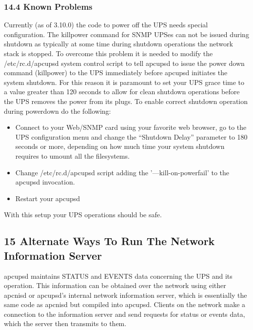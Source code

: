 {{{{{{{{{{\label{Known-Problems}

\subsubsection*{14.4 Known Problems}

Currently (as of 3.10.0) the code to power off the UPS needs special
configuration. The killpower command for SNMP UPSes can not be issued during
shutdown as typically at some time during shutdown operations the network
stack is stopped. To overcome this problem it is needed to modify the
/etc/rc.d/apcupsd system control script to tell apcupsd to issue the power
down command (killpower) to the UPS immediately before apcupsd initiates the
system shutdown. For this reason it is paramount to set your UPS grace time to
a value greater than 120 seconds to allow for clean shutdown operations before
the UPS removes the power from its plugs. To enable correct shutdown operation
during powerdown do the following:  

\begin{itemize}
\item Connect to your Web/SNMP card using your favorite web browser, go to the
UPS configuration menu and change the ``Shutdown Delay'' parameter to 180
seconds or more, depending on how much time your system shutdown requires to
umount all the filesystems.  
\item Change /etc/rc.d/apcupsd script adding the '{---}kill-on-powerfail' to
the apcupsd invocation.  
\item Restart your apcupsd 
\end{itemize}

With this setup your UPS operations should be safe. 

\label{Alternate-Ways-To-Run-The-Network-Information-Server}

\subsection*{15 Alternate Ways To Run The Network Information Server}

\label{index-NIS-alternate-was-of-running-165}
apcupsd maintains STATUS and EVENTS data concerning the UPS and its operation.
This information can be obtained over the network using either apcnisd or
apcupsd's internal network information server, which is essentially the same
code as apcnisd but compiled into apcupsd. Clients on the network make a
connection to the information server and send requests for status or events
data, which the server then transmits to them.  

}}}}}}}}}}
